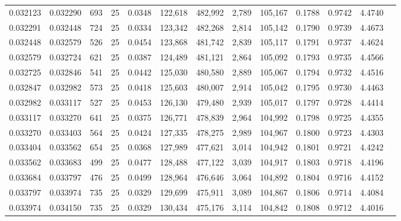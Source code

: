 \begin{tabular}{rrrrrrrrrrrrr}
0.032123 & 0.032290 &   693 &  25 &                                     0.0348 & 122,618 & 482,992 &   2,789 & 105,167 & 0.1788 & 0.9742 & 4.4740 \\
0.032291 & 0.032448 &   724 &  25 &                                     0.0334 & 123,342 & 482,268 &   2,814 & 105,142 & 0.1790 & 0.9739 & 4.4673 \\
0.032448 & 0.032579 &   526 &  25 &                                     0.0454 & 123,868 & 481,742 &   2,839 & 105,117 & 0.1791 & 0.9737 & 4.4624 \\
0.032579 & 0.032724 &   621 &  25 &                                     0.0387 & 124,489 & 481,121 &   2,864 & 105,092 & 0.1793 & 0.9735 & 4.4566 \\
0.032725 & 0.032846 &   541 &  25 &                                     0.0442 & 125,030 & 480,580 &   2,889 & 105,067 & 0.1794 & 0.9732 & 4.4516 \\
0.032847 & 0.032982 &   573 &  25 &                                     0.0418 & 125,603 & 480,007 &   2,914 & 105,042 & 0.1795 & 0.9730 & 4.4463 \\
0.032982 & 0.033117 &   527 &  25 &                                     0.0453 & 126,130 & 479,480 &   2,939 & 105,017 & 0.1797 & 0.9728 & 4.4414 \\
0.033117 & 0.033270 &   641 &  25 &                                     0.0375 & 126,771 & 478,839 &   2,964 & 104,992 & 0.1798 & 0.9725 & 4.4355 \\
0.033270 & 0.033403 &   564 &  25 &                                     0.0424 & 127,335 & 478,275 &   2,989 & 104,967 & 0.1800 & 0.9723 & 4.4303 \\
0.033404 & 0.033562 &   654 &  25 &                                     0.0368 & 127,989 & 477,621 &   3,014 & 104,942 & 0.1801 & 0.9721 & 4.4242 \\
0.033562 & 0.033683 &   499 &  25 &                                     0.0477 & 128,488 & 477,122 &   3,039 & 104,917 & 0.1803 & 0.9718 & 4.4196 \\
0.033684 & 0.033797 &   476 &  25 &                                     0.0499 & 128,964 & 476,646 &   3,064 & 104,892 & 0.1804 & 0.9716 & 4.4152 \\
0.033797 & 0.033974 &   735 &  25 &                                     0.0329 & 129,699 & 475,911 &   3,089 & 104,867 & 0.1806 & 0.9714 & 4.4084 \\
0.033974 & 0.034150 &   735 &  25 &                                     0.0329 & 130,434 & 475,176 &   3,114 & 104,842 & 0.1808 & 0.9712 & 4.4016 \\

\end{tabular}
